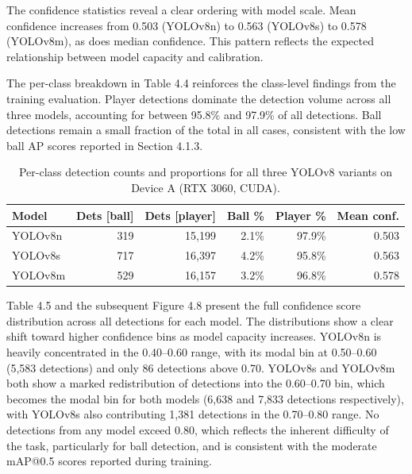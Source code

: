 The confidence statistics reveal a clear ordering with model scale. Mean confidence increases from 0.503 (YOLOv8n) to 0.563 (YOLOv8s) to 0.578 (YOLOv8m), as does median confidence. This pattern reflects the expected relationship between model capacity and calibration.

The per-class breakdown in Table 4.4 reinforces the class-level findings from the training evaluation. Player detections dominate the detection volume across all three models, accounting for between 95.8\% and 97.9\% of all detections. Ball detections remain a small fraction of the total in all cases, consistent with the low ball AP scores reported in Section 4.1.3.

\begin{table}[h]
\centering
\label{tab:inference_rtx3060_class}
\begin{tabular}{lrrrrr}
\toprule
\textbf{Model} & \textbf{Dets [ball]} & \textbf{Dets [player]} & \textbf{Ball \%} & \textbf{Player \%} & \textbf{Mean conf.} \\
\midrule
YOLOv8n & 319 & 15{,}199 & 2.1\% & 97.9\% & 0.503 \\
YOLOv8s & 717 & 16{,}397 & 4.2\% & 95.8\% & 0.563 \\
YOLOv8m & 529 & 16{,}157 & 3.2\% & 96.8\% & 0.578 \\
\bottomrule
\end{tabular}
\caption{Per-class detection counts and proportions for all three YOLOv8 variants on Device A (RTX 3060, CUDA).}
\end{table}

Table 4.5 and the subsequent Figure 4.8 present the full confidence score distribution across all detections for each model. The distributions show a clear shift toward higher confidence bins as model capacity increases. YOLOv8n is heavily concentrated in the 0.40–0.60 range, with its modal bin at 0.50–0.60 (5,583 detections) and only 86 detections above 0.70. YOLOv8s and YOLOv8m both show a marked redistribution of detections into the 0.60–0.70 bin, which becomes the modal bin for both models (6,638 and 7,833 detections respectively), with YOLOv8s also contributing 1,381 detections in the 0.70–0.80 range. No detections from any model exceed 0.80, which reflects the inherent difficulty of the task, particularly for ball detection, and is consistent with the moderate mAP@0.5 scores reported during training.

